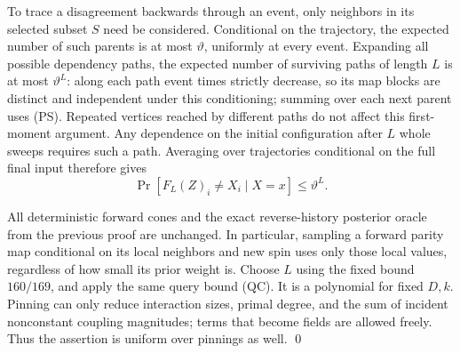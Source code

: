 To trace a disagreement backwards through an event, only neighbors in
its selected subset \(S\) need be considered. Conditional on the
trajectory, the expected number of such parents is at most
\(\vartheta\), uniformly at every event. Expanding all possible
dependency paths, the expected number of surviving paths of length
\(L\) is at most \(\vartheta^L\): along each path event times
strictly decrease, so its map blocks are distinct and independent
under this conditioning; summing over each next parent uses (PS).
Repeated vertices reached by different paths do not affect this
first-moment argument. Any dependence on the initial configuration
after \(L\) whole sweeps requires such a path. Averaging over
trajectories conditional on the full final input therefore gives
\[
 \Pr[F_L(Z)_i\ne X_i\mid X=x]\le\vartheta^L.
\]

All deterministic forward cones and the exact reverse-history
posterior oracle from the previous proof are unchanged. In particular,
sampling a forward parity map conditional on its local neighbors and
new spin uses only those local values, regardless of how small its
prior weight is. Choose \(L\) using the fixed bound \(160/169\),
and apply the same query bound (QC). It is a polynomial for fixed
\(D,k\). Pinning can only reduce interaction sizes, primal degree,
and the sum of incident nonconstant coupling magnitudes; terms that
become fields are allowed freely. Thus the assertion is uniform over
pinnings as well. \qed
